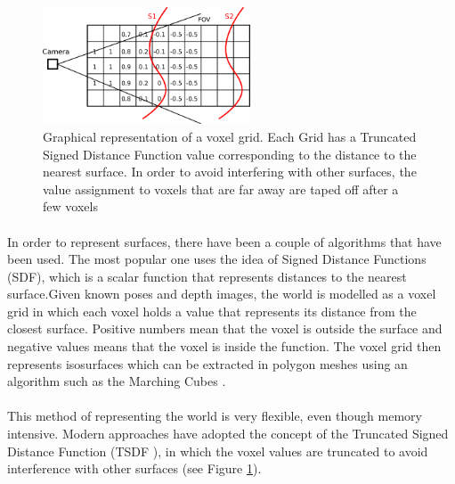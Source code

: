 \documentclass[11pt]{article}
\begin{document}
	\begin{figure}
		\centering
		\includegraphics[width=0.55\textwidth]{TSDF}
		\caption[t]{Graphical representation of a voxel grid. Each Grid has a Truncated Signed Distance Function value corresponding to the distance to the nearest surface. In order to avoid interfering with other surfaces, the value assignment to voxels that are far away are taped off after a few voxels}
		\label{fig:TSDF}
	\end{figure}
	
	\paragraph{}
	In order to represent surfaces, there have been a couple of algorithms that have been used. The most popular one uses the idea of Signed Distance Functions (SDF), which is a scalar function that represents distances to the nearest surface.Given known poses and depth images, the world is modelled as a voxel grid in which each voxel holds  a value that represents its distance from the closest surface. Positive numbers mean that the voxel is outside the surface and negative values means that the voxel is inside the function. The voxel grid then represents isosurfaces which can be extracted in polygon meshes using an algorithm such as the Marching Cubes \cite{marchingcubes}.
	
	
	\paragraph{} This method of representing the world is very flexible, even though memory intensive. Modern approaches have adopted the concept of the Truncated Signed Distance Function (TSDF \cite{TSDF}), in which the voxel values are truncated to avoid interference with other surfaces (see Figure \ref{fig:TSDF}).
	
\end{document}
